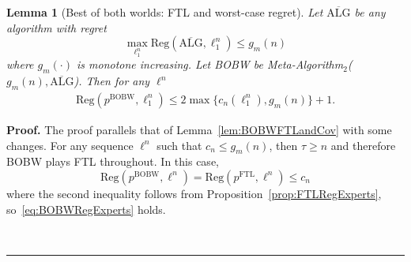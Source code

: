 \documentclass[11pt,letter]{article}
\newtheorem{lemma}{Lemma}
\newenvironment{proof}[1][Proof]{\noindent\textbf{#1.} }{\ \rule{0.5em}{0.5em}}
\newcommand{\Reg}{\mathrm{Reg}}
\newcommand{\pftl}{p^{\mathrm{FTL}}}
\newcommand{\wcalg}{\overline{\text{ALG}}}
\newcommand{\pbobw}{p^{\mathrm{BOBW}}}
\begin{document}
\begin{lemma}[Best of both worlds: FTL and worst-case regret] \label{lem:BOBWmExperts}
    Let $\wcalg$ be any algorithm with regret 
    \[
    \max_{\ell_1^n} \Reg(\wcalg, \ell_1^n) \le g_m(n) 
    \]
    where $g_m(\cdot)$ is monotone increasing. Let BOBW be  Meta-Algorithm$_2$($g_m(n), \wcalg$). Then for any $\ell^n$
    \begin{align}\label{eq:BOBWRegExperts}
        \Reg(\pbobw, \ell_1^n) \le 2 \max\{c_n(\ell_1^n), g_m(n)\} + 1.
    \end{align}
\end{lemma}

\begin{proof}
    The proof parallels that of Lemma~\ref{lem:BOBWFTLandCov} with some changes. For any sequence $\ell^n$ such that $c_{n} \le g_m(n)$, then $\tau \ge n$ and therefore BOBW plays FTL throughout. In this case, 
    \[
     \Reg(\pbobw, \ell^n) = \Reg(\pftl,\ell^n) \le c_n 
    \]
    where the second inequality follows from Proposition~\ref{prop:FTLRegExperts}, so~\eqref{eq:BOBWRegExperts} holds.


\end{proof}
\end{document}
